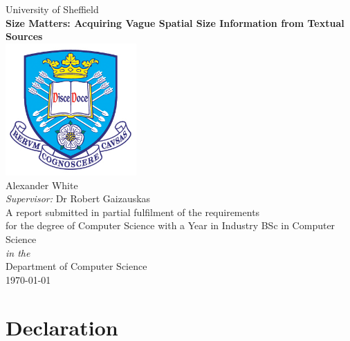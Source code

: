 \documentclass[11pt,oneside]{book}
\begin{document}

\frontmatter

\begin{titlepage}



\begin{center}
{\LARGE University of Sheffield}\\[1.5cm]
\linespread{1.2}\huge {\bfseries Size Matters: Acquiring Vague Spatial Size Information from Textual Sources}\\[1.5cm]
\linespread{1}
\includegraphics[width=5cm]{images/tuoslogo.png}\\[1cm]
{\Large Alexander White}\\[1cm]
{\large \emph{Supervisor:} Dr Robert Gaizauskas}\\[1cm]
\large A report submitted in partial fulfilment of the requirements\\ for the degree of Computer Science with a Year in Industry BSc in Computer Science\\[0.3cm] 
\textit{in the}\\[0.3cm]
Department of Computer Science\\[2cm]
\today
\end{center}

\end{titlepage}



\newpage
\section*{\Large Declaration}
\end{document}
